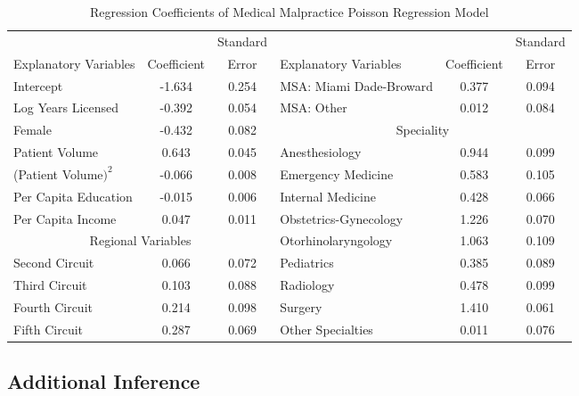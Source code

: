 \begin{table}[h]
  \begin{center} \caption{\label{T12:MedMalPoisson}
Regression Coefficients of Medical Malpractice Poisson Regression
Model}
\begin{tabular}{lcc|lcc}
\hline &  & Standard  &
 & & Standard \\
Explanatory Variables & Coefficient & Error & Explanatory
Variables & Coefficient & Error \\
\hline Intercept & -1.634 & 0.254 & MSA: Miami Dade-Broward & 0.377
& 0.094
\\

Log Years Licensed & -0.392 & 0.054 & MSA: Other & 0.012 &
0.084 \\
\cline{4-6}
Female & -0.432 & 0.082 & \multicolumn{3}{c}{Speciality} \\

Patient Volume & 0.643 & 0.045 & Anesthesiology & 0.944 & 0.099 \\

(Patient Volume$)^2$& -0.066 & 0.008 & Emergency Medicine & 0.583
& 0.105 \\

Per Capita Education & -0.015 & 0.006 & Internal Medicine & 0.428 &
0.066 \\

Per Capita Income & 0.047 & 0.011 & Obstetrics-Gynecology & 1.226 &
0.070 \\
\cline{1-3} \multicolumn{3}{c}{Regional Variables} &
Otorhinolaryngology & 1.063 &
0.109 \\

Second Circuit & 0.066 & 0.072 & Pediatrics & 0.385 & 0.089 \\

Third Circuit & 0.103 & 0.088 & Radiology & 0.478 & 0.099 \\

Fourth Circuit & 0.214 & 0.098 & Surgery & 1.410 & 0.061 \\

Fifth Circuit & 0.287 & 0.069 & Other Specialties & 0.011 & 0.076
\\

 \hline
\end{tabular}

\end{center}  
\linetjed
\end{table}


\subsection{Additional
Inference}\label{S12:PoissonInference}

